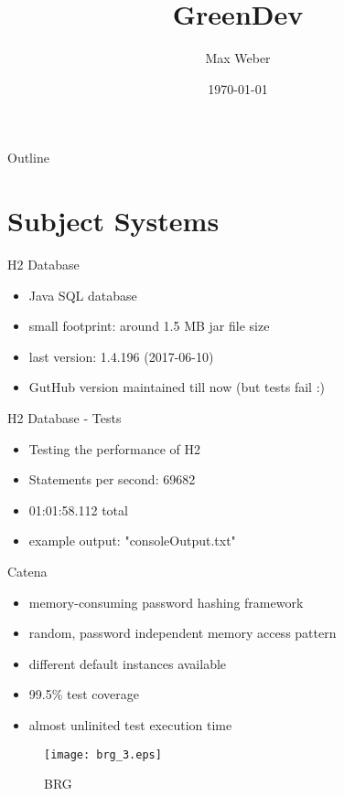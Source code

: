 \documentclass[11pt,aspectratio=169]{beamer}
\title[Green Development]{GreenDev}
\author[M. Weber]{Max Weber}
\institute[Bauhaus-Universität Weimar]{}
\date[\today]{\today}
\begin{document}

\maketitle

\begin{frame}{Outline}
\tableofcontents
\end{frame}

\section{Subject Systems}

\begin{frame}{H2 Database}
  \begin{itemize}
    \item Java SQL database
    \item small footprint: around 1.5 MB jar file size
    \item last version: 1.4.196 (2017-06-10)
    \item GutHub version maintained till now (but tests fail :)
  \end{itemize}
\end{frame}

\begin{frame}{H2 Database - Tests}
  \begin{itemize}
    \item Testing the performance of H2
    \item Statements per second: 69682
    \item 01:01:58.112 total
    \item example output: "consoleOutput.txt"
  \end{itemize}
\end{frame}

\begin{frame}{Catena}
  \begin{itemize}
    \item memory-consuming password hashing framework
    \item random, password independent memory access pattern
    \item different default instances available
    \item 99.5\% test coverage
    \item almost unlinited test execution time
  \end{itemize}
  \begin{figure}[ht]
    \centering
    \texttt{[image: brg\_3.eps]}
    \caption{BRG}
  \end{figure}
\end{frame}
\end{document}
